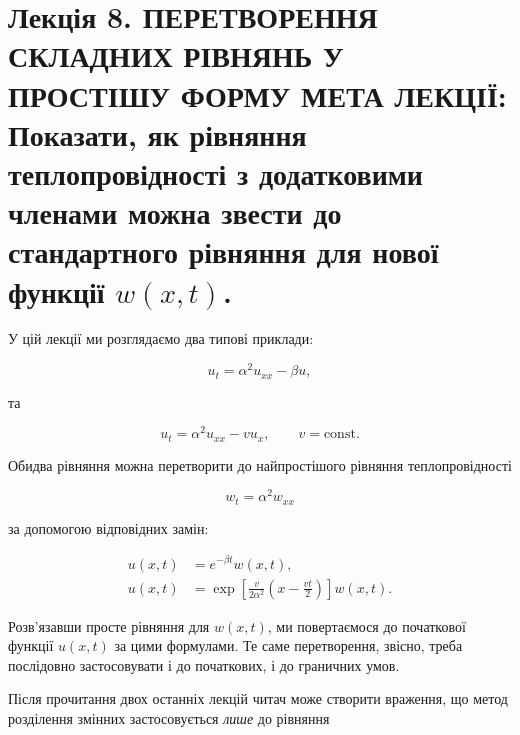\documentclass[
  ukrainian,
]{article}
\begin{document}
\section{\texorpdfstring{Лекція 8. ПЕРЕТВОРЕННЯ СКЛАДНИХ РІВНЯНЬ У
ПРОСТІШУ ФОРМУ МЕТА ЛЕКЦІЇ: Показати, як рівняння теплопровідності з
додатковими членами можна звести до стандартного рівняння для нової
функції
\(w(x,t)\).}{Лекція 8. ПЕРЕТВОРЕННЯ СКЛАДНИХ РІВНЯНЬ У ПРОСТІШУ ФОРМУ МЕТА ЛЕКЦІЇ: Показати, як рівняння теплопровідності з додатковими членами можна звести до стандартного рівняння для нової функції w(x,t).}}\label{ux43bux435ux43aux446ux456ux44f-8.-ux43fux435ux440ux435ux442ux432ux43eux440ux435ux43dux43dux44f-ux441ux43aux43bux430ux434ux43dux438ux445-ux440ux456ux432ux43dux44fux43dux44c-ux443-ux43fux440ux43eux441ux442ux456ux448ux443-ux444ux43eux440ux43cux443-ux43cux435ux442ux430-ux43bux435ux43aux446ux456ux457-ux43fux43eux43aux430ux437ux430ux442ux438-ux44fux43a-ux440ux456ux432ux43dux44fux43dux43dux44f-ux442ux435ux43fux43bux43eux43fux440ux43eux432ux456ux434ux43dux43eux441ux442ux456-ux437-ux434ux43eux434ux430ux442ux43aux43eux432ux438ux43cux438-ux447ux43bux435ux43dux430ux43cux438-ux43cux43eux436ux43dux430-ux437ux432ux435ux441ux442ux438-ux434ux43e-ux441ux442ux430ux43dux434ux430ux440ux442ux43dux43eux433ux43e-ux440ux456ux432ux43dux44fux43dux43dux44f-ux434ux43bux44f-ux43dux43eux432ux43eux457-ux444ux443ux43dux43aux446ux456ux457-wxt.}

У цій лекції ми розглядаємо два типові приклади:

\[
u_t = \alpha^2 u_{xx} - \beta u,
\]

та

\[
u_t = \alpha^2 u_{xx} - v u_x, \qquad v=\text{const}.
\]

Обидва рівняння можна перетворити до найпростішого рівняння
теплопровідності

\[
w_t = \alpha^2 w_{xx}
\]

за допомогою відповідних замін:

\[
\begin{aligned}
u(x,t)&=e^{-\beta t}w(x,t),\\
u(x,t)&=\exp\!\left[\frac{v}{2\alpha^2}\!\left(x-\frac{vt}{2}\right)\right]w(x,t).
\end{aligned}
\]

Розв'язавши просте рівняння для \(w(x,t)\), ми повертаємося до
початкової функції \(u(x,t)\) за цими формулами. Те саме перетворення,
звісно, треба послідовно застосовувати і до початкових, і до граничних
умов.

Після прочитання двох останніх лекцій читач може створити враження, що
метод розділення змінних застосовується \emph{лише} до рівняння
\end{document}
